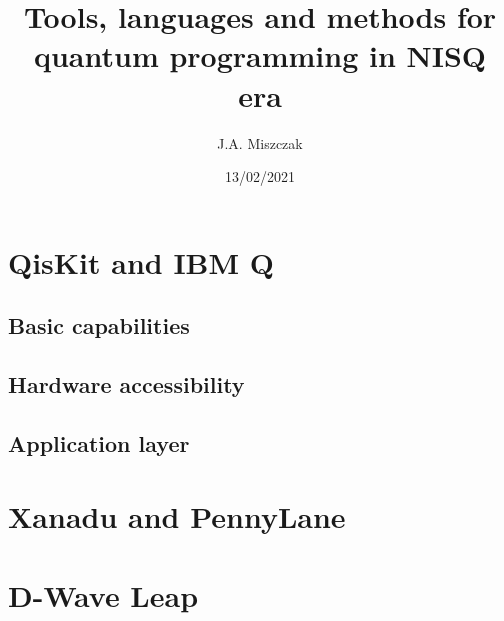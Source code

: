\documentclass[11pt,a4paper]{article}
\title{Tools, languages and methods for quantum programming in NISQ era}
\author{J.A. Miszczak}
\date{13/02/2021}
\begin{document}
\maketitle


\begin{abstract}

\end{abstract}

\section{QisKit and IBM Q}

\subsection{Basic capabilities}

\subsection{Hardware accessibility}

\subsection{Application layer}


\section{Xanadu and PennyLane}



\section{D-Wave Leap}
\end{document}
